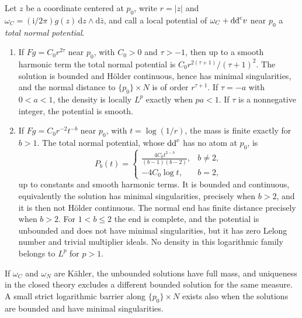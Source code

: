 \begin{theorem}
Let $z$ be a coordinate centered at $p_0$, write $r=|z|$ and $\omega_C=(\mathrm{i}/2\pi)g(z)\,\mathrm{d} z\wedge\mathrm{d}\bar z$, and call a local potential of $\omega_C+\mathrm{dd}^{\mathrm{c}} v$ near $p_0$ a \emph{total normal potential}.
\begin{enumerate}
\item If $Fg=C_0r^{2\tau}$ near $p_0$, with $C_0>0$ and $\tau>-1$, then up to a smooth harmonic term the total normal potential is $C_0r^{2(\tau+1)}/(\tau+1)^2$. The solution is bounded and H\"older continuous, hence has minimal singularities, and the normal distance to $\{p_0\}\times N$ is of order $r^{\tau+1}$. If $\tau=-a$ with $0<a<1$, the density is locally $L^p$ exactly when $pa<1$. If $\tau$ is a nonnegative integer, the potential is smooth.
\item If $Fg=C_0r^{-2}t^{-b}$ near $p_0$, with $t=\log(1/r)$, the mass is finite exactly for $b>1$. The total normal potential, whose $\mathrm{dd}^{\mathrm{c}}$ has no atom at $p_0$, is
\begin{equation}\label{eq:curve-log-primitive}
 P_b(t)=\begin{cases}
 \displaystyle\frac{4C_0t^{2-b}}{(b-1)(b-2)},&b\ne2,\\[4pt]
 -4C_0\log t,&b=2,
 \end{cases}
\end{equation}
up to constants and smooth harmonic terms. It is bounded and continuous, equivalently the solution has minimal singularities, precisely when $b>2$, and it is then not H\"older continuous. The normal end has finite distance precisely when $b>2$. For $1<b\leq2$ the end is complete, and the potential is unbounded and does not have minimal singularities, but it has zero Lelong number and trivial multiplier ideals. No density in this logarithmic family belongs to $L^p$ for $p>1$.
\end{enumerate}
If $\omega_C$ and $\omega_N$ are K\"ahler, the unbounded solutions have full mass, and uniqueness in the closed theory excludes a different bounded solution for the same measure. A small strict logarithmic barrier along $\{p_0\}\times N$ exists also when the solutions are bounded and have minimal singularities.
\end{theorem}


